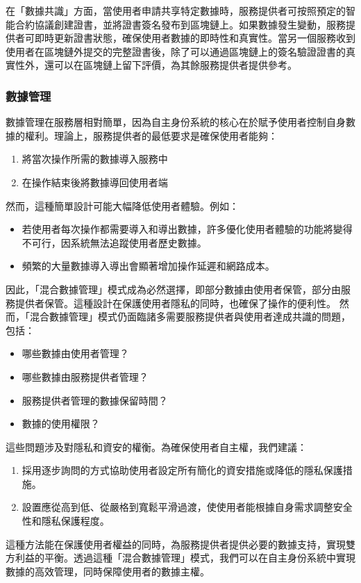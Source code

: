 在「數據共識」方面，當使用者申請共享特定數據時，服務提供者可按照預定的智能合約協議創建證書，並將證書簽名發布到區塊鏈上。如果數據發生變動，服務提供者可即時更新證書狀態，確保使用者數據的即時性和真實性。當另一個服務收到使用者在區塊鏈外提交的完整證書後，除了可以通過區塊鏈上的簽名驗證證書的真實性外，還可以在區塊鏈上留下評價，為其餘服務提供者提供參考。
\subsubsection{數據管理}
數據管理在服務層相對簡單，因為自主身份系統的核心在於賦予使用者控制自身數據的權利。理論上，服務提供者的最低要求是確保使用者能夠：
\begin{enumerate}
  \item 將當次操作所需的數據導入服務中
  \item 在操作結束後將數據導回使用者端
\end{enumerate}
然而，這種簡單設計可能大幅降低使用者體驗。例如：
\begin{itemize}
  \item 若使用者每次操作都需要導入和導出數據，許多優化使用者體驗的功能將變得不可行，因系統無法追蹤使用者歷史數據。
  \item 頻繁的大量數據導入導出會顯著增加操作延遲和網路成本。
\end{itemize}
因此，「混合數據管理」模式成為必然選擇，即部分數據由使用者保管，部分由服務提供者保管。這種設計在保護使用者隱私的同時，也確保了操作的便利性。
然而，「混合數據管理」模式仍面臨諸多需要服務提供者與使用者達成共識的問題，包括：
\begin{itemize}
  \item 哪些數據由使用者管理？
  \item 哪些數據由服務提供者管理？
  \item 服務提供者管理的數據保留時間？
  \item 數據的使用權限？
\end{itemize}
這些問題涉及對隱私和資安的權衡。為確保使用者自主權，我們建議：
\begin{enumerate}
  \item 採用逐步詢問的方式協助使用者設定所有簡化的資安措施或降低的隱私保護措施。
  \item 設置應從高到低、從嚴格到寬鬆平滑過渡，使使用者能根據自身需求調整安全性和隱私保護程度。
\end{enumerate}
這種方法能在保護使用者權益的同時，為服務提供者提供必要的數據支持，實現雙方利益的平衡。透過這種「混合數據管理」模式，我們可以在自主身份系統中實現數據的高效管理，同時保障使用者的數據主權。
